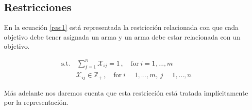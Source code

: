 \subsection{Restricciones}

En la ecuación \ref{res:1} está representada la restricción relacionada con que cada objetivo debe tener asignada un arma y un arma debe estar relacionada con un objetivo. 

\begin{align}
    \label{res:1}
    \textrm{s.t.} & \, \sum^{n}_{j=1}{\mathcal{X}_{ij} } = 1 \,, \quad \textrm{for} \: i = 1, \dots, m \\
    \nonumber
    & \mathcal{X}_{ij} \in \mathds{Z}_{+} \,, \quad \textrm{for} \: i=1, \dots, m, \: j=1, \dots, n 
\end{align}

Más adelante nos daremos cuenta que esta restricción está tratada implícitamente por la representación.